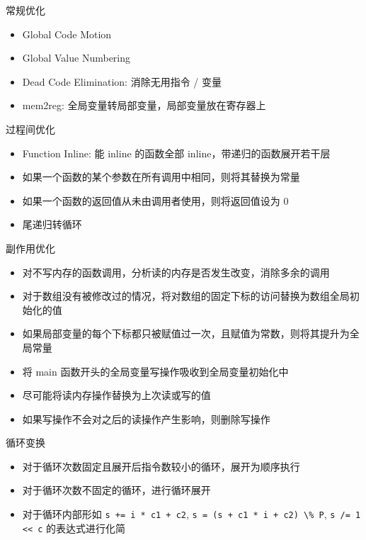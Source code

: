 \documentclass[aspectratio=169,UTF-8]{ctexbeamer}
\begin{document}
		\begin{frame}{常规优化}
			\begin{itemize}
				\item Global Code Motion
				\item Global Value Numbering
				\item Dead Code Elimination: 消除无用指令 / 变量
				\item mem2reg: 全局变量转局部变量，局部变量放在寄存器上
			\end{itemize}
		\end{frame}
		
		\begin{frame}{过程间优化}
			\begin{itemize}
				\item Function Inline: 能 inline 的函数全部 inline，带递归的函数展开若干层
				\item 如果一个函数的某个参数在所有调用中相同，则将其替换为常量	
				\item 如果一个函数的返回值从未由调用者使用，则将返回值设为 0
				\item 尾递归转循环
			\end{itemize}
		\end{frame}
		
		\begin{frame}{副作用优化}
			\begin{itemize}
				\item 对不写内存的函数调用，分析读的内存是否发生改变，消除多余的调用
				\item 对于数组没有被修改过的情况，将对数组的固定下标的访问替换为数组全局初始化的值
				\item 如果局部变量的每个下标都只被赋值过一次，且赋值为常数，则将其提升为全局常量
				\item 将 main 函数开头的全局变量写操作吸收到全局变量初始化中
				\item 尽可能将读内存操作替换为上次读或写的值
				\item 如果写操作不会对之后的读操作产生影响，则删除写操作
			\end{itemize}
		\end{frame}
		
		\begin{frame}{循环变换}
			\begin{itemize}
				\item 对于循环次数固定且展开后指令数较小的循环，展开为顺序执行
				\item 对于循环次数不固定的循环，进行循环展开
				\item 对于循环内部形如 \lstinline{s += i * c1 + c2}, \lstinline{s = (s + c1 * i + c2) \% P}, \lstinline{s /= 1 << c} 的表达式进行化简
			\end{itemize}
		\end{frame}
		
\end{document}
